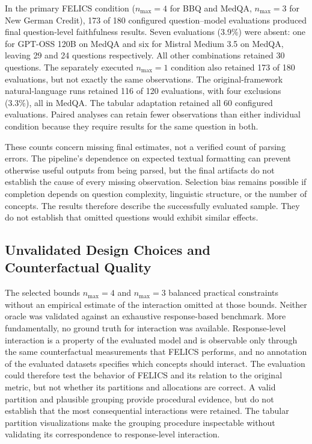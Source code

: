 In the primary FELICS condition ($n_{\max}=4$ for BBQ and MedQA, $n_{\max}=3$ for New German Credit), 173 of 180 configured question--model evaluations produced final question-level faithfulness results. Seven evaluations (3.9\%) were absent: one for GPT-OSS 120B on MedQA and six for Mistral Medium 3.5 on MedQA, leaving 29 and 24 questions respectively. All other combinations retained 30 questions. The separately executed $n_{\max}=1$ condition also retained 173 of 180 evaluations, but not exactly the same observations. The original-framework natural-language runs retained 116 of 120 evaluations, with four exclusions (3.3\%), all in MedQA. The tabular adaptation retained all 60 configured evaluations. Paired analyses can retain fewer observations than either individual condition because they require results for the same question in both.

These counts concern missing final estimates, not a verified count of parsing errors. The pipeline's dependence on expected textual formatting can prevent otherwise useful outputs from being parsed, but the final artifacts do not establish the cause of every missing observation. Selection bias remains possible if completion depends on question complexity, linguistic structure, or the number of concepts. The results therefore describe the successfully evaluated sample. They do not establish that omitted questions would exhibit similar effects.

\subsection{Unvalidated Design Choices and Counterfactual Quality}

The selected bounds $n_{\max}=4$ and $n_{\max}=3$ balanced practical constraints without an empirical estimate of the interaction omitted at those bounds. Neither oracle was validated against an exhaustive response-based benchmark. More fundamentally, no ground truth for interaction was available. Response-level interaction is a property of the evaluated model and is observable only through the same counterfactual measurements that FELICS performs, and no annotation of the evaluated datasets specifies which concepts should interact. The evaluation could therefore test the behavior of FELICS and its relation to the original metric, but not whether its partitions and allocations are correct. A valid partition and plausible grouping provide procedural evidence, but do not establish that the most consequential interactions were retained. The tabular partition visualizations make the grouping procedure inspectable without validating its correspondence to response-level interaction.

